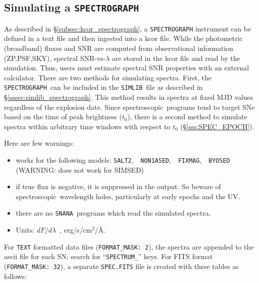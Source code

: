 \documentclass[12pt]{article}
\newcommand{\SPEC}{{\tt SPECTROGRAPH}}
\newcommand{\Flam}{dF/d\lambda}
\newcommand{\snana}{{\tt SNANA}}
\newcommand{\simlib}{{\tt SIMLIB}}
\newcommand{\spec}{spectroscopic}
\begin{document}
  \clearpage
   \subsection{Simulating a {\SPEC} }
   \label{subsec:sim_spec}

As described in \S\ref{subsec:kcor_spectrograph}, 
a {\SPEC} instrument can be defined in a text file
and then ingested into a kcor file.
While the photometric (broadband) fluxes and SNR are computed 
from observational information (ZP,PSF,SKY), 
spectral SNR-vs-$\lambda$ are stored in the kcor file and 
read by the simulation.
Thus, users must estimate spectral SNR properties with an 
external calculator. There are two methods for simulating spectra.
First, the \SPEC\ can be included in the \simlib\ file
as described in \S\ref{sssec:simlib_spectrograph}.
This method results in spectra at fixed MJD values
regardless of the explosion date. Since \spec\ programs
tend to target SNe based on the time of peak brightness ($t_0$),
there is a second method to simulate spectra within arbitrary 
time windows with respect to $t_0$ (\S\ref{sss:SPEC_EPOCH}).


\medskip
Here are few warnings:
\begin{itemize}
  \item works for the following models: 
       {\tt SALT2},~~{\tt NON1ASED},~~{\tt FIXMAG},~~{\tt BYOSED} \\
         (WARNING: does not work for SIMSED)
  \item if true flux is negative, it is suppressed in the output. 
        So beware of \spec\ wavelength holes, 
        particularly at early epochs and the UV.
  \item there are no \snana\ programs which read the simulated spectra.
  \item Units: $\Flam$~, erg/s/cm$^2$/\AA.
\end{itemize}

\medskip
For {\tt TEXT} formatted data files ({\tt FORMAT\_MASK: 2}),
the spectra are appended to the ascii file for each SN; 
search for ``{\tt SPECTRUM\_}'' keys.
For FITS format ({\tt FORMAT\_MASK: 32}), 
a separate {\tt *SPEC.FITS} file is created
with three tables as follows:
\end{document}
